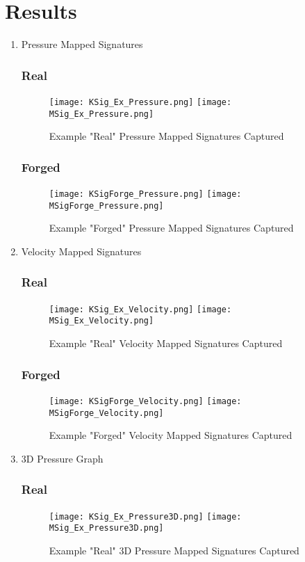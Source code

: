 \documentclass[a4paper]{article}
\begin{document}
\section{Results}
\begin{enumerate}
\item Pressure Mapped Signatures
	\subsubsection*{Real}
	\begin{figure}[H]
    \texttt{[image: KSig\_Ex\_Pressure.png]}
    \texttt{[image: MSig\_Ex\_Pressure.png]}
    \caption{Example "Real" Pressure Mapped Signatures Captured}
    \end{figure}
    \subsubsection*{Forged}
    \begin{figure}[H]
    \texttt{[image: KSigForge\_Pressure.png]}
    \texttt{[image: MSigForge\_Pressure.png]}
    \caption{Example "Forged" Pressure Mapped Signatures Captured}
    \end{figure}
\item Velocity Mapped Signatures
	\subsubsection*{Real}
    \begin{figure}[H]
    \texttt{[image: KSig\_Ex\_Velocity.png]}
    \texttt{[image: MSig\_Ex\_Velocity.png]}
    \caption{Example "Real" Velocity Mapped Signatures Captured}
    \end{figure}
    \subsubsection*{Forged}
    \begin{figure}[H]
    \texttt{[image: KSigForge\_Velocity.png]}
    \texttt{[image: MSigForge\_Velocity.png]}
    \caption{Example "Forged" Velocity Mapped Signatures Captured}
    \end{figure}
\item 3D Pressure Graph
	\subsubsection*{Real}
	\begin{figure}[H]
    \texttt{[image: KSig\_Ex\_Pressure3D.png]}
    \texttt{[image: MSig\_Ex\_Pressure3D.png]}
    \caption{Example "Real" 3D Pressure Mapped Signatures Captured}
    \end{figure}

\end{enumerate}
\end{document}
